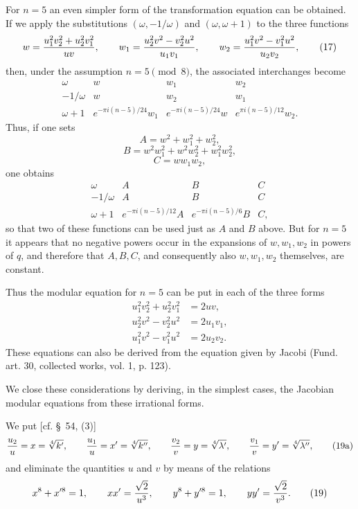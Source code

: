 \documentclass[11pt]{article}
\begin{document}
For $n=5$ an even simpler form of the transformation equation can be obtained. If we apply the substitutions $(\omega,-1/\omega)$ and $(\omega,\omega+1)$ to the three functions
\begin{equation}
 w={u_1^2v_2^2+u_2^2v_1^2\over uv},\qquad
 w_1={u_2^2v^2-v_2^2u^2\over u_1v_1},\qquad
 w_2={u_1^2v^2-v_1^2u^2\over u_2v_2},
\tag{17}
\end{equation}
then, under the assumption $n=5\pmod8$, the associated interchanges become
\[
\begin{array}{c|ccc}
\omega&w&w_1&w_2\\[0.2em]
-1/\omega&w&w_2&w_1\\[0.2em]
\omega+1&e^{-\pi i(n-5)/24}w_1&e^{-\pi i(n-5)/24}w&e^{\pi i(n-5)/12}w_2.
\end{array}
\]
Thus, if one sets
\[
 A=w^2+w_1^2+w_2^2,
\]
\[
 B=w^2w_1^2+w^2w_2^2+w_1^2w_2^2,
\]
\[
 C=ww_1w_2,
\]
one obtains
\[
\begin{array}{c|ccc}
\omega&A&B&C\\[0.2em]
-1/\omega&A&B&C\\[0.2em]
\omega+1&e^{-\pi i(n-5)/12}A&e^{-\pi i(n-5)/6}B&C,
\end{array}
\]
so that two of these functions can be used just as $A$ and $B$ above. But for $n=5$ it appears that no negative powers occur in the expansions of $w,w_1,w_2$ in powers of $q$, and therefore that $A,B,C$, and consequently also $w,w_1,w_2$ themselves, are constant.

Thus the modular equation for $n=5$ can be put in each of the three forms
\begin{equation}
\begin{aligned}
 u_1^2v_2^2+u_2^2v_1^2&=2uv,\\
 u_2^2v^2-v_2^2u^2&=2u_1v_1,\\
 u_1^2v^2-v_1^2u^2&=2u_2v_2.
\end{aligned}
\tag{18}
\end{equation}
These equations can also be derived from the equation given by Jacobi (Fund. art. 30, collected works, vol. 1, p. 123).

We close these considerations by deriving, in the simplest cases, the Jacobian modular equations from these irrational forms.

We put [cf. \S~54, (3)]
\begin{equation}
 {u_2\over u}=x=\sqrt[4]{k'},\qquad {u_1\over u}=x'=\sqrt[4]{k''},
 \qquad
 {v_2\over v}=y=\sqrt[4]{\lambda'},\qquad {v_1\over v}=y'=\sqrt[4]{\lambda''},
\tag{19a}
\end{equation}
and eliminate the quantities $u$ and $v$ by means of the relations
\begin{equation}
 x^8+x'^8=1,
 \qquad xx'={\sqrt2\over u^3},
 \qquad
 y^8+y'^8=1,
 \qquad yy'={\sqrt2\over v^3}.
\tag{19}
\end{equation}
\end{document}
